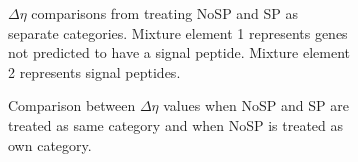 \documentclass[11pt]{labbook}
\begin{document}
\begin{figure}
\begin{center}
\begin{subfigure}{0.6\textwidth}
\caption{$\Delta\eta$ comparisons from treating NoSP and SP as separate categories. Mixture element 1 represents genes not predicted to have a signal peptide. Mixture element 2 represents signal peptides.}
\end{subfigure}%
\end{center}
\begin{subfigure}{0.52\textwidth}
\caption{Comparison between $\Delta\eta$ values when NoSP and SP are treated as same category and when NoSP is treated as own category.}
\end{subfigure}%
\begin{subfigure}{0.52\textwidth}

\end{subfigure}
\end{figure}
\end{document}

